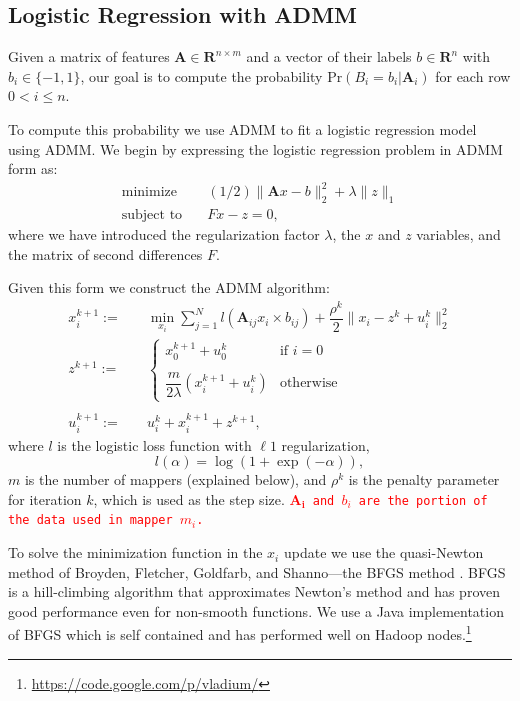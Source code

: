 \documentclass[10pt, conference, compsocconf]{IEEEtran}
\newcommand{\todo}[1]{\texttt{\textcolor{red}{#1}}}
\begin{document}
\subsection{Logistic Regression with ADMM}
Given a matrix of features $\mathbf{A}\in\mathbf{R}^{n\times m}$ and a vector of their labels $b\in\mathbf{R}^n$ with $b_i\in\{-1,1\}$, our goal is to compute the probability $\text{Pr}(B_i=b_i|\mathbf{A}_i)$ for each row $0<i\leq n$.

To compute this probability we use ADMM to fit a logistic regression model using ADMM.  We begin by expressing the logistic regression problem in ADMM form as:
\begin{align*}
\text{minimize}&\quad (1/2)\|\mathbf{A}x-b\|_2^2+\lambda\|z\|_1\\
\text{subject to}&\quad Fx-z=0,
\end{align*}
where we have introduced the regularization factor $\lambda$, the $x$ and $z$ variables, and the matrix of second differences $F$.

Given this form we construct the ADMM algorithm:
\begin{align}
\label{eq:x}
x_i^{k+1} :=&\quad \min_{x_i} \sum_{j=1}^Nl(\mathbf{A}_{ij}x_i\times b_{ij}) + \dfrac{\rho^k}{2}\|x_i - z^k + u_i^k\|_2^2\\
\label{eq:z}
z^{k+1} :=&\quad \begin{cases}
    x_0^{k+1} + u_0^k& \text{if $i=0$}\\
    \\
    \dfrac{m}{2\lambda}(x_i^{k+1} + u_i^k)& \text{otherwise}
  \end{cases}\\
\nonumber\\
\label{eq:u}
u_i^{k+1} :=&\quad u_i^k + x_i^{k+1} + z^{k+1},
\end{align}
where $l$ is the logistic loss function with $\ell1$ regularization,
\begin{equation*}
l(\alpha)=\log(1+\exp(-\alpha)),
\end{equation*}
$m$ is the number of mappers (explained below), and $\rho^k$ is the penalty parameter for iteration $k$, which is used as the step size. \todo{$\mathbf{A_i}$ and $b_i$ are the portion of the data used in mapper $m_i$.}

To solve the minimization function in the $x_i$ update we use the quasi-Newton method of Broyden, Fletcher, Goldfarb, and Shanno---the BFGS method \cite{bonnans2003numerical}.  BFGS is a hill-climbing algorithm that approximates Newton's method and has proven good performance even for non-smooth functions.  We use a Java implementation of BFGS which is self contained and has performed well on Hadoop nodes.\footnote{\url{https://code.google.com/p/vladium/}}
\end{document}

